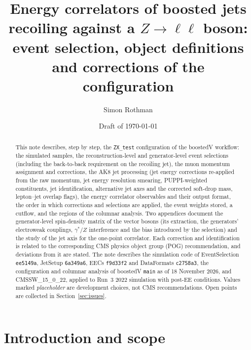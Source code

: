 \documentclass[11pt]{article}
\title{Energy correlators of boosted jets recoiling against a $Z\to\ell\ell$ boson:\\
event selection, object definitions and corrections of the \code{ZX\_test} configuration}
\author{Simon Rothman}
\date{Draft of \today}
\newcommand{\code}[1]{\texttt{#1}}
\begin{document}
\sloppy
\maketitle

\begin{abstract}
This note describes, step by step, the \code{ZX\_test} configuration of the boostedV workflow: the simulated samples,
the reconstruction-level and generator-level event selections (including the back-to-back requirement on the
recoiling jet), the muon momentum assignment and corrections, the AK8 jet processing (jet energy corrections re-applied
from the raw momentum, jet energy resolution smearing, PUPPI-weighted constituents, jet identification, alternative jet
axes and the corrected soft-drop mass, lepton--jet overlap flags), the energy correlator observables and their output
format, the order in which corrections and selections are applied, the event weights
stored, a cutflow, and the regions of the columnar analysis. Two appendices document the generator-level spin-density
matrix of the vector bosons (its extraction, the generators' electroweak couplings, $\gamma^*/Z$ interference and the
bias introduced by the selection) and the study of the jet axis for the one-point correlator. Each correction and identification is related to the
corresponding CMS physics object group (POG) recommendation, and deviations from it are stated. The note
describes the simulation code of EventSelection \code{ee5149a}, JetSetup \code{6a349a6}, EECs \code{f9d33f2} and
DataFormats \code{c2758a3}, the configuration and columnar analysis of boostedV \code{main} as of 18 November 2026, and
CMSSW\_15\_0\_22, applied to Run~3 2022 simulation with post-EE conditions. Values marked \emph{placeholder} are development choices, not CMS recommendations. Open points
are collected in Section~\ref{sec:issues}.
\end{abstract}

\tableofcontents
\newpage

\section{Introduction and scope}
\label{sec:intro}
\end{document}
